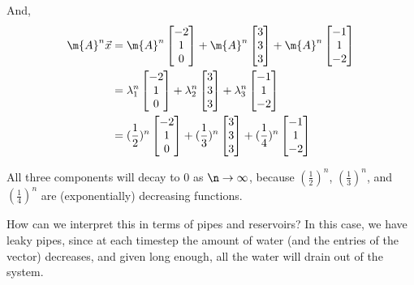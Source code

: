 \begin{enumerate}[label=(\alph*)]
{    And, 
    \begin{align*}
    \m{A}^n\vec{x} &= \m{A}^n \begin{bmatrix}-2 \\ 1 \\ 0\end{bmatrix} + \m{A}^n \begin{bmatrix}3 \\ 3 \\ 3\end{bmatrix} + \m{A}^n \begin{bmatrix}-1 \\ 1 \\ -2\end{bmatrix} \\
    &= \lambda_1^n \begin{bmatrix}-2 \\ 1 \\ 0\end{bmatrix} + \lambda_2^n \begin{bmatrix}3 \\ 3 \\ 3\end{bmatrix} + \lambda_3^n \begin{bmatrix}-1 \\ 1 \\ -2\end{bmatrix} \\
    &= (\frac{1}{2})^n \begin{bmatrix}-2 \\ 1 \\ 0\end{bmatrix} + (\frac{1}{3})^n \begin{bmatrix}3 \\ 3 \\ 3\end{bmatrix} + (\frac{1}{4})^n \begin{bmatrix}-1 \\ 1 \\ -2\end{bmatrix} \\
    \end{align*}
    
    All three components will decay to 0 as $\n\to\infty$, because $(\frac{1}{2})^n$, $(\frac{1}{3})^n$, and $(\frac{1}{4})^n$ are (exponentially) decreasing functions.
    
    How can we interpret this in terms of pipes and reservoirs? In this case, we have leaky pipes, since at each timestep the amount of water (and the entries of the vector) decreases, and given long enough, all the water will drain out of the system.
    
}
\end{enumerate}
